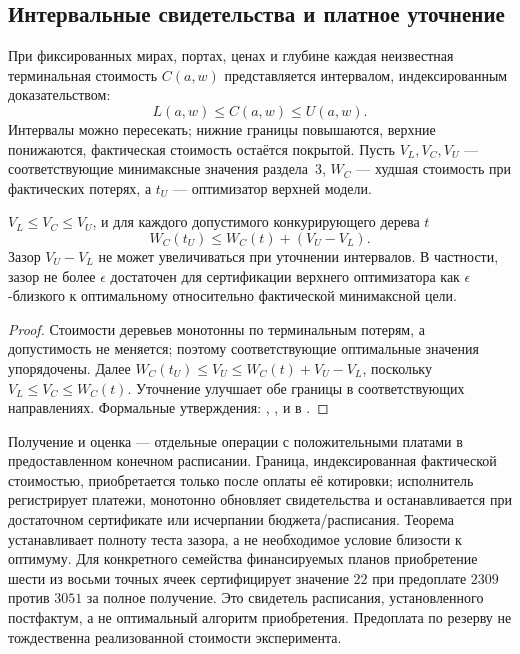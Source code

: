 \subsection{Интервальные свидетельства и платное уточнение}
При фиксированных мирах, портах, ценах и глубине каждая неизвестная терминальная стоимость $C(a,w)$ представляется интервалом, индексированным доказательством:
\[
  L(a,w)\le C(a,w)\le U(a,w).
\]
Интервалы можно пересекать; нижние границы повышаются, верхние понижаются, фактическая стоимость остаётся покрытой. Пусть $V_L,V_C,V_U$ --- соответствующие минимаксные значения раздела~3, $W_C$ --- худшая стоимость при фактических потерях, а $t_U$ --- оптимизатор верхней модели.
\begin{theorem}\label{thm:interval}
$V_L\le V_C\le V_U$, и для каждого допустимого конкурирующего дерева $t$
\[
 W_C(t_U)\le W_C(t)+(V_U-V_L).
\]
Зазор $V_U-V_L$ не может увеличиваться при уточнении интервалов. В частности, зазор не более $\epsilon$ достаточен для сертификации верхнего оптимизатора как $\epsilon$-близкого к оптимальному относительно фактической минимаксной цели.
\end{theorem}
\begin{proof}
Стоимости деревьев монотонны по терминальным потерям, а допустимость не меняется; поэтому соответствующие оптимальные значения упорядочены. Далее $W_C(t_U)\le V_U\le W_C(t)+V_U-V_L$, поскольку $V_L\le V_C\le W_C(t)$. Уточнение улучшает обе границы в соответствующих направлениях. Формальные утверждения: , ,  и  в .
\end{proof}
Получение и оценка --- отдельные операции с положительными платами в предоставленном конечном расписании. Граница, индексированная фактической стоимостью, приобретается только после оплаты её котировки; исполнитель регистрирует платежи, монотонно обновляет свидетельства и останавливается при достаточном сертификате или исчерпании бюджета/расписания. Теорема  устанавливает полноту теста зазора, а не необходимое условие близости к оптимуму. Для конкретного семейства финансируемых планов приобретение шести из восьми точных ячеек сертифицирует значение $22$ при предоплате $2309$ против $3051$ за полное получение. Это свидетель расписания, установленного постфактум, а не оптимальный алгоритм приобретения. Предоплата по резерву не тождественна реализованной стоимости эксперимента.

